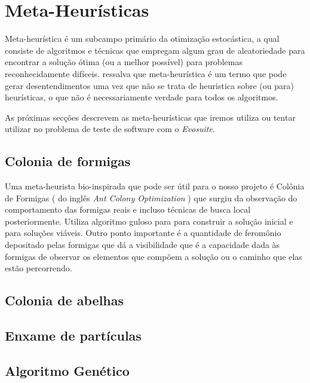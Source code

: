\documentclass[12pt,a4paper]{article}
\begin{document}
\newpage

\section{Meta-Heurísticas} 

Meta-heurística é um subcampo primário da otimização estocástica, a qual consiste de algoritmos e técnicas que empregam algum grau de aleatoriedade para encontrar a solução ótima (ou a
melhor possível) para problemas reconhecidamente difíceis. \citeauthor{luke2009essentials} \cite{luke2009essentials} ressalva que meta-heurística é um termo que pode gerar desentendimentos
uma vez que não se trata de heuristica sobre (ou para) heurísticas, o que não é necessariamente verdade para todos os algoritmos.  

As próximas secções descrevem as meta-heurísticas que iremos utiliza ou tentar utilizar no problema de teste de software com o \textit{Evosuite}.

\subsection{Colonia de formigas}

Uma meta-heurista bio-inspirada que pode ser útil para o nosso projeto é Colônia de Formigas \cite{dorigo1999ant} ( do inglês \textit{Ant Colony Optimization} ) que surgiu da observação do
comportamento das formigas reais e incluso técnicas de busca local posteriormente. Utiliza algoritmo guloso para para construir a solução inicial e para soluções viáveis. Outro ponto
importante é a quantidade de feromônio depositado pelas formigas que dá a visibilidade que é a capacidade dada às formigas de observar os elementos que compõem a solução ou o caminho que
elas estão percorrendo.





\subsection{Colonia de abelhas}

\subsection{Enxame de partículas}

\subsection{Algoritmo Genético}
\label{sec:alg_genetic}
\end{document}

